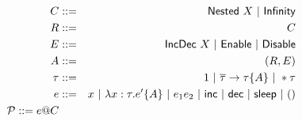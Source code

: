 \documentclass{article}
\begin{document}
\begin{eqnarray*}
	C & ::= & {\sf Nested}~ X ~|~ {{\sf Infinity}} \\
	R & ::= & C \\
	E & ::= & {\sf IncDec}~ X ~|~ {{\sf Enable}} ~|~ {{\sf Disable}} \\
	A & ::= & (R,E) \\
	\tau & ::= & {1} ~|~ \overline{\tau} \rightarrow \tau \{A\} ~|~ *\tau \\
	e & ::= & x ~|~ \lambda x:\tau . e' \{A\} ~|~ e_1 e_2 ~|~ {{\sf inc}} ~|~ {{\sf dec}} ~|~ {{\sf sleep}} ~|~ () \\
	\mathcal{P} ::= e@C \\
\end{eqnarray*}
\end{document}
